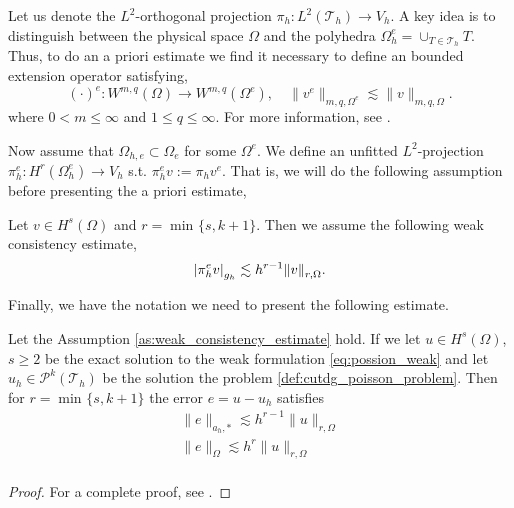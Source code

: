 Let us denote the $L^2$-orthogonal projection $\pi _{h}: L^2( \mathcal{T} _{h}) \to V_{h}$. A key idea is to distinguish between the physical space $\Omega $ and the polyhedra $\Omega ^{e}_{h} = \cup _{T\in \mathcal{T} _{h} } T$. Thus, to do an
a priori estimate we find it necessary to define an bounded extension operator satisfying, \[
( \cdot ) ^{e}: W^{m,q}( \Omega )  \to W^{m,q} ( \Omega ^{e}), \quad \| v^{e} \|_{ m,q,\Omega ^{e}  }^{  } \lesssim \| v \|_{ m,q, \Omega  }^{  }.
\]
where $0< m \le \infty$ and $1 \le q \le \infty$. For more information, see \cite{gurkan2019stabilized}.

Now assume that $\Omega _{h,e} \subset  \Omega_{e} $ for some $\Omega^{e}  $. We define an unfitted $L^2$-projection $\pi _{h}^{e}: H^{r}( \Omega ^{e}_{h}) \to V_{h}$ s.t.  $\pi ^{e} _{h} v := \pi _{h} v^{e}$.
That is, we will do the following assumption before presenting the a priori estimate,
\begin{assumption}[EP2]
    \label{as:weak_consistency_estimate}
    Let $v \in H^{s}( \Omega )  $  and $r = \min_{} \{ s, k+1 \}$.  Then we assume the following weak consistency estimate, \[
    \left\lvert  \pi ^{e}_{h} v  \right\rvert _{g_{h}} \lesssim  h^{r-1}\| v \|_{ r,\Omega  }^{  }.
    \]

\end{assumption}

Finally, we have the notation we need to present the following estimate.

\begin{theorem}
    Let the Assumption \ref{as:weak_consistency_estimate} hold. If we let $u \in H^{s}( \Omega ) $, $s\ge 2$ be the exact solution to the weak formulation \eqref{eq:possion_weak} and let $u_{h} \in \mathcal{P}^{k}( \mathcal{T} _{h})  $ be the solution the problem \ref{def:cutdg_poisson_problem}. Then for $r =
    \min_{}\{s, k+1\} $ the error $e = u - u_{h}$ satisfies \[
        \begin{split}
    \| e \|_{ a_{h},* }^{  } \lesssim   h^{r-1} \| u \|_{ r,\Omega  }^{  }\\
    \| e \|_{ \Omega  }^{  } \lesssim   h^{r} \| u \|_{ r,\Omega  }^{  }\\
        \end{split}
    \]
\end{theorem}
\begin{proof}
    For a complete proof, see \cite{gurkan2019stabilized}.
\end{proof}


